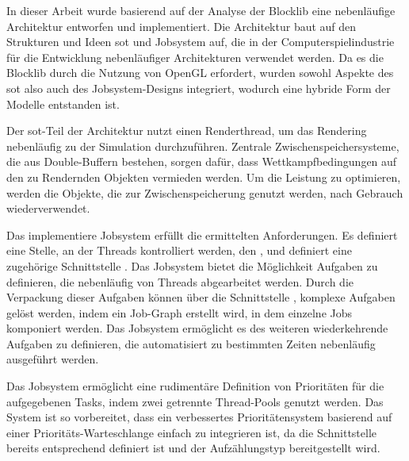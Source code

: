 In dieser Arbeit wurde basierend auf der Analyse der Blocklib eine nebenläufige Architektur entworfen und implementiert. Die Architektur baut auf den Strukturen und Ideen \acl{sot} und Jobsystem auf, die in der Computerspielindustrie für die Entwicklung nebenläufiger Architekturen verwendet werden. Da es die Blocklib durch die Nutzung von OpenGL erfordert, wurden sowohl Aspekte des \ac{sot} also auch des Jobsystem-Designs integriert, wodurch eine hybride Form der Modelle entstanden ist.

Der \ac{sot}-Teil der Architektur nutzt einen Renderthread, um das Rendering nebenläufig zu der Simulation durchzuführen. Zentrale Zwischenspeichersysteme, die aus Double-Buffern bestehen, sorgen dafür, dass Wettkampfbedingungen auf den zu Rendernden Objekten vermieden werden. Um die Leistung zu optimieren, werden die Objekte, die zur Zwischenspeicherung genutzt werden, nach Gebrauch wiederverwendet.

Das implementiere Jobsystem erfüllt die ermittelten Anforderungen. Es definiert eine Stelle, an der Threads kontrolliert werden, den , und definiert eine zugehörige Schnittstelle . Das Jobsystem bietet die Möglichkeit Aufgaben zu definieren, die nebenläufig von Threads abgearbeitet werden. Durch die Verpackung dieser Aufgaben können über die Schnittstelle , komplexe Aufgaben gelöst werden, indem ein Job-Graph erstellt wird, in dem einzelne Jobs komponiert werden. Das Jobsystem ermöglicht es des weiteren wiederkehrende Aufgaben zu definieren, die automatisiert zu bestimmten Zeiten nebenläufig ausgeführt werden.

Das Jobsystem ermöglicht eine rudimentäre Definition von Prioritäten für die aufgegebenen Tasks, indem zwei getrennte Thread-Pools genutzt werden. Das System ist so vorbereitet, dass ein verbessertes Prioritätensystem basierend auf einer Prioritäts-Warteschlange einfach zu integrieren ist, da die Schnittstelle  bereits entsprechend definiert ist und der Aufzählungstyp  bereitgestellt wird.